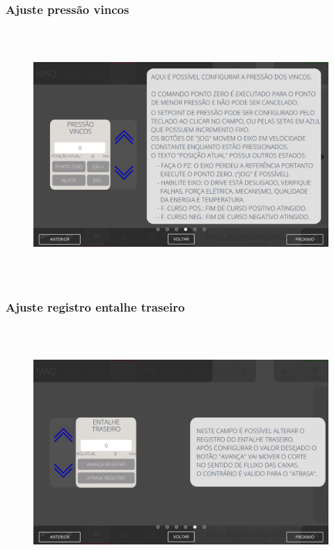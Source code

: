 \newpage
\thispagestyle{fancy}
\vspace*{\fill}
\subsubsection{\small{Ajuste pressão vincos}}
\begin{figure}[h]
  \centering
  \includegraphics[width=576px,height=360px]{src/imagesFlexo/05-slotter/settings/e-4.png}
\end{figure}
\vspace*{\fill}

\newpage
\thispagestyle{fancy}
\vspace*{\fill}
\subsubsection{\small{Ajuste registro entalhe traseiro}}
\begin{figure}[h]
  \centering
  \includegraphics[width=576px,height=360px]{src/imagesFlexo/05-slotter/settings/e-5.png}
\end{figure}
\vspace*{\fill}

